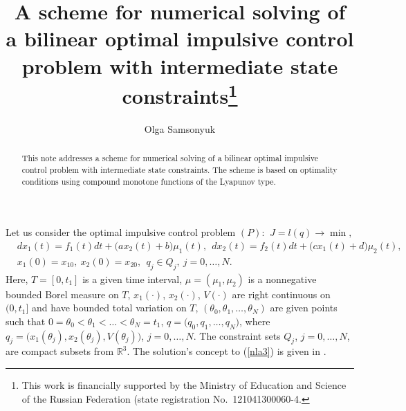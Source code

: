 \documentclass[12pt]{llncs}
\begin{document}
 

%
\fi

\title{A scheme for numerical  solving of a bilinear optimal impulsive control problem with intermediate state constraints\thanks{This work is financially supported by the Ministry of Education and Science of the Russian Federation (state registration No.~121041300060-4.}}
\author{Olga Samsonyuk}

\maketitle

\begin{abstract}
This note addresses a  scheme for numerical solving of a bilinear  optimal impulsive control problem with intermediate state constraints.  The scheme is based on optimality conditions using compound monotone functions of the Lyapunov type.

\end{abstract}

Let us consider the optimal impulsive control problem  $(P)$: $\ J=l(q)\rightarrow \min,$
\begin{align}
& d{x}_1(t)=f_1(t)dt+\big(ax_2(t)+b\big)\mu_1(t),  
 \ \  d{x}_2(t)=f_2(t)dt+\big(cx_1(t)+d\big)\mu_2(t),  
 \label{nla3}\\ 
 &  x_1(0)=x_{10}, \  x_2(0)=x_{20}, \ \   q_j\in Q_j,\  j=0,\ldots,N   .\label{nla5}
\end{align}
Here, $T=[0,t_1]$ is a given time interval,  $\mu=(\mu_1, \mu_2)$ is a nonnegative bounded Borel measure on $T$,  $x_1(\cdot)$,  $x_2(\cdot)$,  $V(\cdot)$ are right continuous on $(0,t_1]$ and have bounded total variation on $T$,    $(\theta_0,\theta_1,\ldots,\theta_N)$ are given points such that $0=\theta_0<\theta_1<\ldots<\theta_N=t_1$, $q=\big(q_0,q_1,\ldots,q_N\big)$, where $ q_j=\big(x_1(\theta_j),x_2(\theta_j),V(\theta_j)\big)$, $j=0,\ldots,N$. The constraint sets $Q_j$, $j=0,\ldots,N$, are compact subsets from ${\mathbb R}^3$. The solution's concept to (\ref{nla3}) is given in \cite{samnla2}.
\end{document}
